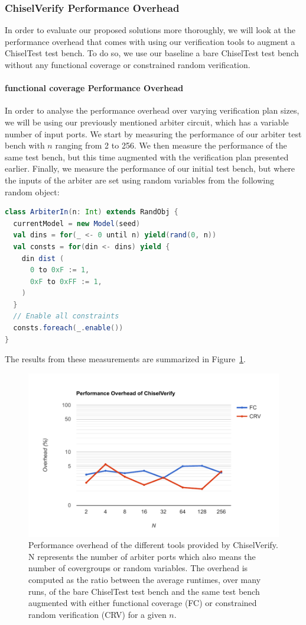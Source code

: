 \documentclass[conference]{IEEEtran}
\begin{document}
\subsubsection{ChiselVerify Performance Overhead}
In order to evaluate our proposed solutions more thoroughly, we will look at the performance overhead that comes with using our verification tools to augment a ChiselTest test bench.
To do so, we use our baseline a bare ChiselTest test bench without any functional coverage or constrained random verification.

\paragraph{functional coverage Performance Overhead} In order to analyse the performance overhead over varying verification plan sizes, we will be using our previously mentioned arbiter circuit, which has a variable number of input ports.
We start by measuring the performance of our arbiter test bench with $n$ ranging from 2 to 256.
We then measure the performance of the same test bench, but this time augmented with the verification plan presented earlier.
Finally, we measure the performance of our initial test bench, but where the inputs of the arbiter are set using random variables from the following random object:
\begin{lstlisting}[language=scala]
class ArbiterIn(n: Int) extends RandObj {
  currentModel = new Model(seed)
  val dins = for(_ <- 0 until n) yield(rand(0, n))
  val consts = for(din <- dins) yield {
    din dist (
      0 to 0xF := 1,
      0xF to 0xFF := 1,
    )
  }
  // Enable all constraints
  consts.foreach(_.enable())
}
\end{lstlisting}
The results from these measurements are summarized in Figure~\ref{fig:cvoverhead}.
\begin{figure}[h]
  \centering
  \includegraphics[trim=0.7cm 0.5cm 1cm 1cm, clip, width=.9\linewidth]{cvoverhead.pdf}
  \caption{Performance overhead of the different tools provided by ChiselVerify. N represents the number of arbiter ports which also means the number of covergroups or random variables. The overhead is computed as the ratio between the average runtimes, over many runs, of the bare ChiselTest test bench and the same test bench augmented with either functional coverage (FC) or constrained random verification (CRV) for a given $n$.}
  \label{fig:cvoverhead}
\end{figure}
\end{document}
